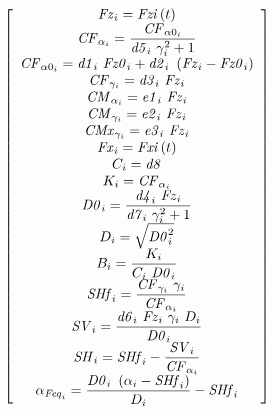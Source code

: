 %
\begin{equation}
    \left[ \begin {array}{c} {\it Fz}_{i} ={\it Fzi} \left(t \right)
    \\ \displaystyle {\it CF}_{\alpha_{i}} =\frac{{\it CF}_{\alpha0_{i
    }} }{{\it d5}_{i} ~\gamma_{i} ^{2}+1}\\ {\it CF}_{
    \alpha0_{i}} ={\it d1}_{i} ~{\it Fz0}_{i} +{\it d2}_{i} ~\left({\it Fz
    }_{i} -{\it Fz0}_{i} \right)\\ {\it CF}_{\gamma_{i}}
     ={\it d3}_{i} ~{\it Fz}_{i} \\ {\it CM}_{\alpha_{i}
    } ={\it e1}_{i} ~{\it Fz}_{i} \\ {\it CM}_{\gamma_{i
    }} ={\it e2}_{i} ~{\it Fz}_{i} \\ {\it CMx}_{\gamma_
    {i}} ={\it e3}_{i} ~{\it Fz}_{i} \\ {\it Fx}_{i} ={
    \it Fxi} \left(t \right)\\ C_{i} ={\it d8} 
    \\ K_{i} ={\it CF}_{\alpha_{i}} 
    \\ \displaystyle {\it D0}_{i} =\frac{{\it d4}_{i} ~{\it Fz}_{i} }{
    {\it d7}_{i} ~\gamma_{i} ^{2}+1}\\ D_{i} =\sqrt{{
    \it D0}_{i} ^{2}}\\ \displaystyle B_{i} =\frac{K_{i} }{C_{i} ~{
    \it D0}_{i} }\\ \displaystyle {\it SHf}_{i} =\frac{{\it CF}_{
    \gamma_{i}} ~\gamma_{i} }{{\it CF}_{\alpha_{i}} }\\ 
    \displaystyle {\it SV}_{i} =\frac{{\it d6}_{i} ~{\it Fz}_{i} ~\gamma_{i} ~D_{i} }{{
    \it D0}_{i} }\\ \displaystyle {\it SH}_{i} ={\it SHf}_{i} -\frac{{
    \it SV}_{i} }{{\it CF}_{\alpha_{i}} }\\ \displaystyle \alpha_{{
    \it Feq}_{i}} =\frac{{\it D0}_{i} ~\left(\alpha_{i} -{\it SHf}_{i} 
    \right)}{D_{i} }-{\it SHf}_{i} \end {array} \right]    
\end{equation}
